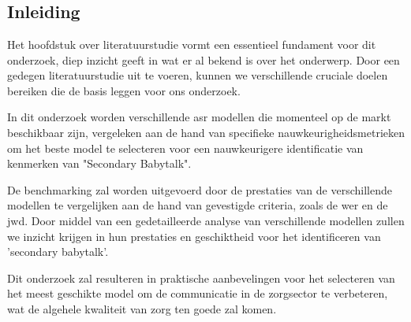 \chapter{}%
\label{ch:stand-van-zaken}

\section{Inleiding}


Het hoofdstuk over literatuurstudie vormt een essentieel fundament voor dit onderzoek, diep inzicht ge­eft in wat er al beke­nd is over het onderwe­rp. Door een gedegen literatuurstudie uit te voeren, kunnen we verschillende cruciale doelen bereiken die de basis leggen voor ons onderzoek.

In dit onderzoek worden verschillende \gls{asr} modellen die momenteel op de markt beschikbaar zijn, vergeleken aan de hand van specifieke nauwkeurigheidsmetrieken om het beste model te selecteren voor een nauwkeurigere identificatie van kenmerken van "Secondary Babytalk".


De benchmarking zal worden uitgevoerd door de prestaties van de verschillende modellen te vergelijken aan de hand van gevestigde criteria, zoals de \gls{wer} en de \gls{jwd}. 
Door middel van een gedetailleerde analyse van verschillende modellen zullen we inzicht krijgen in hun prestaties en geschiktheid voor het identificeren van 'secondary babytalk'. 


Dit onderzoek zal resulteren in praktische aanbevelingen voor het selecteren van het meest geschikte model om de communicatie in de zorgsector te verbeteren, wat de algehele kwaliteit van zorg ten goede zal komen.


